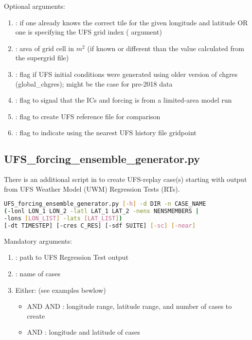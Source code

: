 Optional arguments:
\begin{enumerate}
\item {}: if one already knows the correct tile for the given longitude and latitude OR one is specifying the UFS grid index ( argument)
\item {}: area of grid cell in $m^2$ (if known or different than the value calculated from the supergrid file)
\item {}: flag if UFS initial conditions were generated using older version of chgres (global\_chgres); might be the case for pre-2018 data
\item {}: flag to signal that the ICs and forcing is from a limited-area model run
\item {}: flag to create UFS reference file for comparison
\item {}: flag to indicate using the nearest UFS history file gridpoint
\end{enumerate}

\subsection{UFS\_forcing\_ensemble\_generator.py}
\label{subsection: ufsforcingensemblegenerator}
There is an additional script in  to create UFS-replay case(s) starting with output from UFS Weather Model (UWM) Regression Tests (RTs).

\begin{lstlisting}[language=bash]
UFS_forcing_ensemble_generator.py [-h] -d DIR -n CASE_NAME
(-lonl LON_1 LON_2 -latl LAT_1 LAT_2 -nens NENSMEMBERS |
-lons [LON_LIST] -lats [LAT_LIST])
[-dt TIMESTEP] [-cres C_RES] [-sdf SUITE] [-sc] [-near]
\end{lstlisting}

Mandatory arguments:
\begin{enumerate}
\item {}: path to UFS Regression Test output
\item {}: name of cases
\item Either: (see examples bewlow) 
      \begin{itemize}
           \item {} AND  AND : longitude range, latitude range, and number of cases to create
           \item {} AND : longitude and latitude of cases
      \end{itemize}
\end{enumerate}

